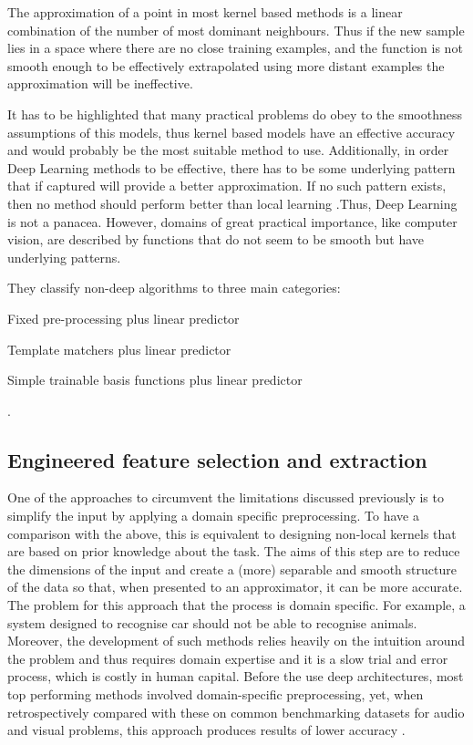 \documentclass[a4paper]{report}
\begin{document}
		The approximation of a point in most kernel based methods is a linear combination of the number of most dominant neighbours. Thus if the new sample lies in a space where there are no close training examples, and the function is not smooth enough to be effectively extrapolated using more distant examples the approximation will be ineffective.
		
		It has to be highlighted that many practical problems do obey to the smoothness assumptions of this models, thus kernel based models have an effective accuracy and would probably be the most suitable method to use. Additionally, in order Deep Learning methods to be effective, there has to be some underlying pattern that if captured will provide a better approximation. If no such pattern exists, then no method should perform better than local learning \cite{Bengio2009}.Thus, Deep Learning is not a panacea. However, domains of great practical importance, like computer vision, are described by functions that do not seem to be smooth but have underlying patterns.
		
		They classify non-deep algorithms to three main categories: 
		\begin{enumerate*}
			\item Fixed pre-processing plus linear predictor		
			\item Template matchers plus linear predictor
			\item Simple trainable basis functions plus linear predictor
		\end{enumerate*}.

	\subsection{Engineered feature selection and extraction}
		One of the approaches to circumvent the limitations discussed previously is to simplify the input by applying a domain specific preprocessing. To have a comparison with the above, this is equivalent to designing non-local kernels that are based on prior knowledge about the task. The aims of this step are to reduce the dimensions of the input and create a (more) separable and smooth structure of the data so that, when presented to an approximator, it can be more accurate. The problem for this approach that the process is domain specific\cite{Bengio2007}. For example, a system designed to recognise car should not  be able to recognise animals. Moreover, the development of such methods relies heavily on the intuition around the problem and thus requires domain expertise and it is a slow trial and error process, which is costly in human capital. Before the use deep architectures, most top performing methods involved domain-specific preprocessing, yet, when retrospectively compared with these on common benchmarking datasets for audio and visual problems, this approach produces results of lower accuracy \cite{Krizhevsky2012}. 
		
\end{document}
